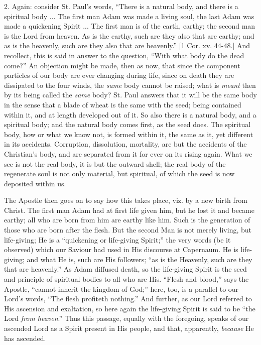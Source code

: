 2. Again: consider St. Paul's words, ``There is a natural body,
and there is a spiritual body ... The first man Adam was made a living
soul, the last Adam was made a quickening Spirit ... The first man is
of the earth, earthy; the second man is the Lord from heaven. As is
the earthy, such are they also that are earthy; and as is the
heavenly, such are they also that are heavenly.'' [1 Cor. xv.
44-48.] And recollect, this is said in answer to the question,
``With what body do the dead come?'' An objection might be
made, then as now, that since the component particles of our body are
ever changing during life, since on death they are dissipated to the
four winds, the \emph{same} body cannot be raised; what is \emph{meant}
then by its being called the \emph{same} body? St. Paul answers that it will
be the same body in the sense that a blade of wheat is the same with
the seed; being contained within it, and at length developed out of
it. So also there is a natural body, and a spiritual body; and the
natural body comes first, as the seed does. The spiritual body, how or
what we know not, is formed within it, the same as it, yet different
in its accidents. Corruption, dissolution, mortality, are but the
accidents of the Christian's body, and are separated from it for ever
on its rising again. What we see is not the real body, it is but the
outward shell; the real body of the regenerate soul is not only
material, but spiritual, of which the seed is now deposited within us.

The Apostle then goes on to say how this takes place, viz. by a new
birth from Christ. The first man Adam had at first life given
him, but he lost it and became earthy; all who are born from him are
earthy like him. Such is the generation of those who are born after
the flesh. But the second Man is not merely living, but life-giving;
He is a ``quickening or life-giving Spirit;'' the very words
(be it observed) which our Saviour had used in His discourse at
Capernaum. He is life-giving; and what He is, such are His followers;
``as is the Heavenly, such are they that are heavenly.'' As
Adam diffused death, so the life-giving Spirit is the seed and
principle of spiritual bodies to all who are His. ``Flesh and
blood,'' says the Apostle, ``cannot inherit the kingdom of
God;'' here, too, is a parallel to our Lord's words, ``The
flesh profiteth nothing.'' And further, as our Lord referred to
His ascension and exaltation, so here again the life-giving Spirit is
said to be ``the Lord \emph{from heaven}.'' Thus this passage,
equally with the foregoing, speaks of our ascended Lord as a Spirit
present in His people, and that, apparently, \emph{because} He has
ascended.

